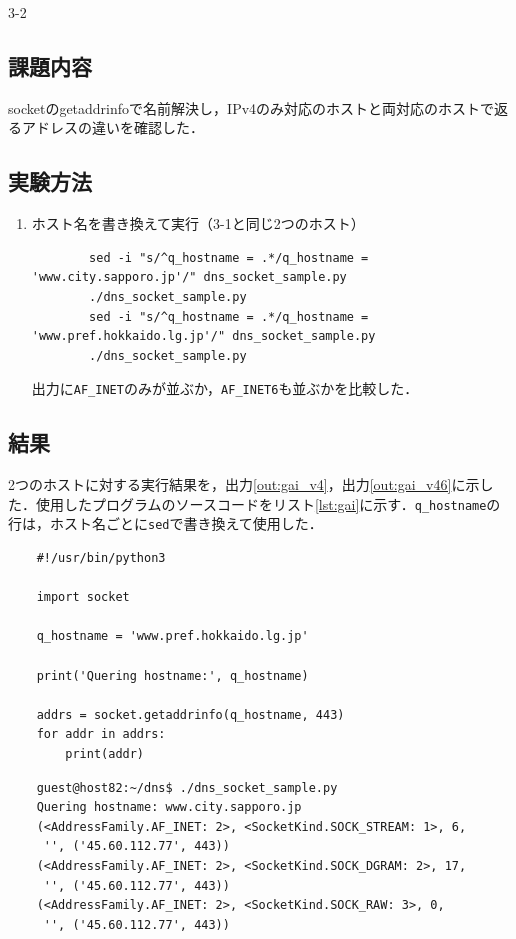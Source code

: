 \begin{maintask}{3-2}
  \subsection*{課題内容}
  socketのgetaddrinfoで名前解決し，IPv4のみ対応のホストと両対応のホストで返るアドレスの違いを確認した．

  \subsection*{実験方法}
  \begin{enumerate}
    \item ホスト名を書き換えて実行（3-1と同じ2つのホスト）
      \begin{verbatim}
        sed -i "s/^q_hostname = .*/q_hostname = 'www.city.sapporo.jp'/" dns_socket_sample.py
        ./dns_socket_sample.py
        sed -i "s/^q_hostname = .*/q_hostname = 'www.pref.hokkaido.lg.jp'/" dns_socket_sample.py
        ./dns_socket_sample.py
      \end{verbatim}
      出力に\texttt{AF\_INET}のみが並ぶか，\texttt{AF\_INET6}も並ぶかを比較した．
  \end{enumerate}

  \subsection*{結果}
  2つのホストに対する実行結果を，出力\ref{out:gai_v4}，出力\ref{out:gai_v46}に示した．使用したプログラムのソースコードをリスト\ref{lst:gai}に示す．\texttt{q\_hostname}の行は，ホスト名ごとに\texttt{sed}で書き換えて使用した．

  \begin{listing}[H]
    \caption{dns\_socket\_sample.py のソースコード}\label{lst:gai}
    \begin{verbatim}
    #!/usr/bin/python3

    import socket

    q_hostname = 'www.pref.hokkaido.lg.jp'

    print('Quering hostname:', q_hostname)

    addrs = socket.getaddrinfo(q_hostname, 443)
    for addr in addrs:
        print(addr)
    \end{verbatim}
  \end{listing}

  \begin{termout}[H]
    \caption{dns\_socket\_sample.py(www.city.sapporo.jp) の実行結果}\label{out:gai_v4}
    \begin{verbatim}
    guest@host82:~/dns$ ./dns_socket_sample.py
    Quering hostname: www.city.sapporo.jp
    (<AddressFamily.AF_INET: 2>, <SocketKind.SOCK_STREAM: 1>, 6,
     '', ('45.60.112.77', 443))
    (<AddressFamily.AF_INET: 2>, <SocketKind.SOCK_DGRAM: 2>, 17,
     '', ('45.60.112.77', 443))
    (<AddressFamily.AF_INET: 2>, <SocketKind.SOCK_RAW: 3>, 0,
     '', ('45.60.112.77', 443))
    \end{verbatim}
  \end{termout}


\end{maintask}
